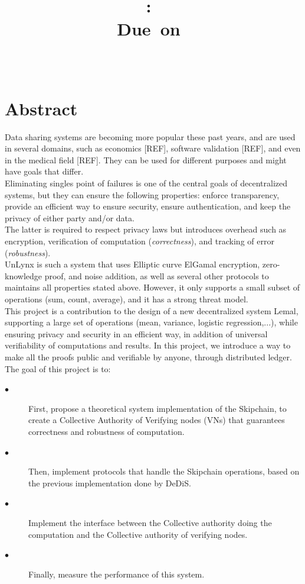 \documentclass{article}
\title{
\logoepfl
\vspace{2in}
\textmd{\textbf{\hmwkClass:\ \hmwkTitle}}\\
\normalsize\vspace{0.1in}\small{Due\ on\ \hmwkDueDate}\\
\vspace{0.1in}\large{\textit{\hmwkClassInstructor\ \hmwkClassTime}}
\author{\textbf{\hmwkAuthorName}}
\vspace{3in}
}
\begin{document}
\maketitle

\newpage
\section*{Abstract}
Data sharing systems are becoming more popular these past years, and are used in several domains, such as economics [REF], software validation [REF], and even in the medical field [REF]. They can be used for different purposes and might have goals that differ.\\
Eliminating singles point of failures is one of the central goals of decentralized systems,  but they can ensure the following properties: enforce transparency, provide an efficient way to ensure security, ensure authentication, and keep the privacy of either party and/or data.\\
The latter is required to respect privacy laws but introduces overhead such as encryption, verification of computation (\textit{correctness}), and tracking of error (\textit{robustness}).\\
UnLynx is such a system that uses Elliptic curve ElGamal encryption, zero-knowledge proof, and noise addition, as well as several other protocols to maintains all properties stated above. However, it only supports a small subset of operations (sum, count, average), and it has a strong threat model.\\
This project is a contribution to the design of a new decentralized system Lemal, supporting a large set of operations (mean, variance, logistic regression,...), while ensuring privacy and security in an efficient way, in addition of universal verifiability of computations and results.
In this project, we introduce a way to make all the proofs public and verifiable by anyone, through distributed ledger.
The goal of this project is to:
\begin{description}
\item[$\bullet$] First, propose a theoretical system implementation of the Skipchain, to create a Collective Authority of Verifying nodes (VNs) that guarantees correctness and robustness of computation.
\item[$\bullet$] Then, implement protocols that handle the Skipchain operations, based on the previous implementation done by DeDiS.
\item[$\bullet$] Implement the interface between the Collective authority doing the computation and the Collective authority of verifying nodes.
\item[$\bullet$] Finally, measure the performance of this system.
\end{description}
\end{document}

